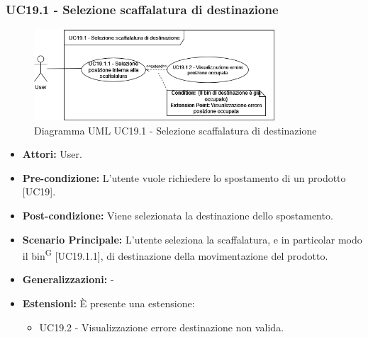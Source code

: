 \subsubsection{UC19.1 - Selezione scaffalatura di destinazione}
\begin{figure}[H]
  \centering
  \includegraphics[width=0.8\textwidth]{UC_diagrams_11-20/UC19.1.drawio.png}
   \caption{Diagramma UML UC19.1 - Selezione scaffalatura di destinazione}
\end{figure}
\begin{itemize}
    \item \textbf{Attori:} User.
    \item \textbf{Pre-condizione:} L'utente vuole richiedere lo spostamento di un prodotto [UC19].
    \item \textbf{Post-condizione:} Viene selezionata la destinazione dello spostamento.
    \item \textbf{Scenario Principale:} L'utente seleziona la scaffalatura, e in particolar modo il bin\textsuperscript{G} [UC19.1.1], di destinazione della movimentazione del prodotto.
    \item \textbf{Generalizzazioni:} -
    \item \textbf{Estensioni:} È presente una estensione:
    \begin{itemize}
        \item UC19.2 - Visualizzazione errore destinazione non valida.
    \end{itemize}
\end{itemize}



